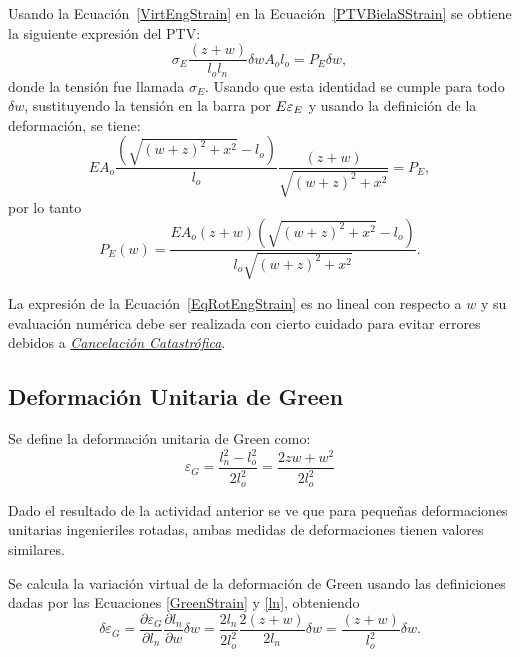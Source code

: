 Usando la Ecuación~\eqref{VirtEngStrain} en la Ecuación~\eqref{PTVBielaSStrain} se obtiene la siguiente expresión del PTV:
%
\begin{equation}
\sigma_E \frac{(z+w)}{l_o l_n } \delta w A_o l_o  = P_E \delta w,
\end{equation}
%
donde la tensión fue llamada $\sigma_E$. %
%
Usando que esta identidad se cumple para todo $\delta w$, sustituyendo la tensión en la barra por $E \varepsilon_E$ y usando la definición de la deformación, se tiene:
%
\begin{equation}
  E A_o \frac{ \left( \sqrt{ (w+z)^2 + x^2 } - l_o \right) }{ l_o }
               \frac{ (z+w) }{ \sqrt{(w+z)^2+x^2} } = P_E,
\end{equation}
%
por lo tanto
%
\begin{equation}\label{EqRotEngStrain}
\boxed{
  P_E( w ) = \frac{EA_o(z+w)\left(\sqrt{(w+z)^2+x^2}-l_o\right)}{l_o\sqrt{(w+z)^2+x^2}}.
}
\end{equation}

La expresión de la Ecuación~\eqref{EqRotEngStrain} es no lineal con respecto a $w$ y su evaluación numérica debe ser realizada con cierto cuidado para evitar errores debidos a \href{https://en.wikipedia.org/wiki/Catastrophic_cancellation}{\textit{Cancelación Catastrófica}}.


\subsection{Deformación Unitaria de Green}

Se define la deformación unitaria de Green como:
%
\begin{equation}\label{GreenStrain}
\varepsilon_G = \frac{l_n^2 - l_o^2}{2l_o^2} = \frac{2zw+w^2}{2l_o^2}
\end{equation}


Dado el resultado de la actividad anterior se ve que para pequeñas deformaciones unitarias ingenieriles rotadas, ambas medidas de deformaciones tienen valores similares.

Se calcula la variación virtual de la deformación de Green usando las definiciones dadas por las Ecuaciones \eqref{GreenStrain} y \eqref{ln}, obteniendo
%
\begin{equation}\label{VirtGreenStrain}
\delta \varepsilon_G = \frac{\partial \varepsilon_G}{\partial l_n}\frac{\partial l_n}{\partial w}\delta w =	\frac{2l_n}{2l_o^2}\frac{2(z+w)}{2l_n}\delta w = \frac{(z+w)}{l_o^2}\delta w.
\end{equation}

